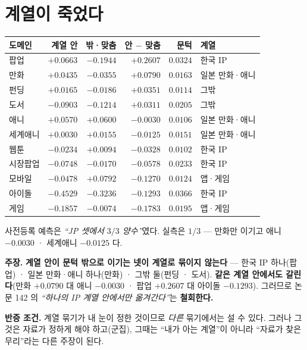 \documentclass[10pt,a4paper]{article}
\newcommand{\claim}[2]{\begin{claimbox}\textbf{주장.} #1\par\smallskip
  \textcolor{gray!70}{\textbf{반증 조건.} #2}\end{claimbox}}
\begin{document}
\section{계열이 죽었다}

\begin{center}
\begin{tabular}{lrrrrl}
\toprule
도메인 & 계열 안 & 밖·맞춤 & \textbf{안 $-$ 맞춤} & 문턱 & 계열 \\
\midrule
팝업 & $+0.0663$ & $-0.1944$ & $\mathbf{+0.2607}$ & $0.0324$ & 한국 IP \\
만화 & $+0.0435$ & $-0.0355$ & $\mathbf{+0.0790}$ & $0.0163$ & 일본 만화·애니 \\
펀딩 & $+0.0165$ & $-0.0186$ & $\mathbf{+0.0351}$ & $0.0114$ & 그밖 \\
도서 & $-0.0903$ & $-0.1214$ & $\mathbf{+0.0311}$ & $0.0205$ & 그밖 \\
\midrule
애니 & $+0.0570$ & $+0.0600$ & $-0.0030$ & $0.0106$ & 일본 만화·애니 \\
세계애니 & $+0.0030$ & $+0.0155$ & $-0.0125$ & $0.0151$ & 일본 만화·애니 \\
웹툰 & $-0.0234$ & $+0.0094$ & $-0.0328$ & $0.0102$ & 한국 IP \\
시장팝업 & $-0.0748$ & $-0.0170$ & $-0.0578$ & $0.0233$ & 한국 IP \\
모바일 & $-0.0478$ & $+0.0792$ & $-0.1270$ & $0.0124$ & 앱·게임 \\
아이돌 & $-0.4529$ & $-0.3236$ & $-0.1293$ & $0.0366$ & 한국 IP \\
게임 & $-0.1857$ & $-0.0074$ & $-0.1783$ & $0.0195$ & 앱·게임 \\
\bottomrule
\end{tabular}
\end{center}

사전등록 예측은 \emph{``JP 셋에서 $3/3$ 양수''}였다. 실측은 \textbf{$1/3$} --- 만화만
이기고 애니 $-0.0030$ · 세계애니 $-0.0125$ 다.

\claim{\textbf{계열 안이 문턱 밖으로 이기는 넷이 계열로 묶이지 않는다} --- 한국 IP
하나(팝업) · 일본 만화·애니 하나(만화) · 그밖 둘(펀딩 · 도서). \textbf{같은 계열
안에서도 갈린다}(만화 $+0.0790$ 대 애니 $-0.0030$ · 팝업 $+0.2607$ 대 아이돌
$-0.1293$). 그러므로 논문 142 의 \emph{``하나의 IP 계열 안에서만 옮겨간다''}는
\textbf{철회한다.}}
{계열 묶기가 내 눈이 정한 것이므로 \emph{다른} 묶기에서는 설 수 있다. 그러나
그것은 자료가 정하게 해야 하고(군집), 그때는 ``내가 아는 계열''이 아니라 ``자료가
찾은 무리''라는 다른 주장이 된다.}
\end{document}
